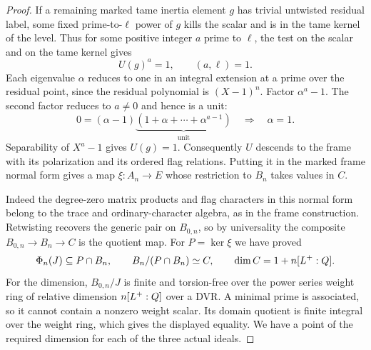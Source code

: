 \begin{proof}
If a remaining marked tame inertia element \(g\) has trivial
untwisted residual label, some fixed prime-to-\(\ell\) power
of \(g\) kills the scalar and is in the tame kernel of the level.
Thus for some positive integer \(a\) prime to \(\ell\), the test on the scalar and on the tame kernel gives
\[
 U(g)^a=1,\qquad(a,\ell)=1 .
\]
Each eigenvalue \(\alpha\) reduces to one in an integral
extension at a prime over the residual point, since the residual
polynomial is \((X-1)^n\). Factor \(\alpha^a-1\). The second factor reduces to \(a\ne0\) and hence is a unit:
\[
 0=(\alpha-1)\underbrace{(1+\alpha+\cdots+\alpha^{a-1})}_{\text{unit}}\quad\Longrightarrow\quad \alpha=1 .
\] Separability of
\(X^a-1\) gives \(U(g)=1\). Consequently \(U\) descends to the
frame with its polarization and its ordered flag relations.
Putting it in the marked frame normal form gives a map
\(\xi:A_n\to E\) whose restriction to \(B_n\) takes values in
\(C\).

Indeed the degree-zero matrix products and flag
characters in this normal form belong to the trace and
ordinary-character algebra, as in the frame construction.
Retwisting recovers the generic pair on \(B_{0,n}\), so by
universality the composite \(B_{0,n}\to B_n\to C\) is the
quotient map. For \(P=\ker\xi\) we have proved
\[
       \Phi_n(J)\subseteq P\cap B_n,\qquad
       B_n/(P\cap B_n)\simeq C,\qquad
       \dim C=1+n[L^+:Q].
\]
For the dimension, \(B_{0,n}/J\) is finite and torsion-free
over the power series weight ring of relative dimension
\(n[L^+:Q]\) over a DVR. A minimal prime is associated,
so it cannot contain a nonzero weight scalar. Its domain
quotient is finite integral over the weight ring, which gives
the displayed equality. We have a point of the required
dimension for each of the three actual ideals.
\end{proof}
